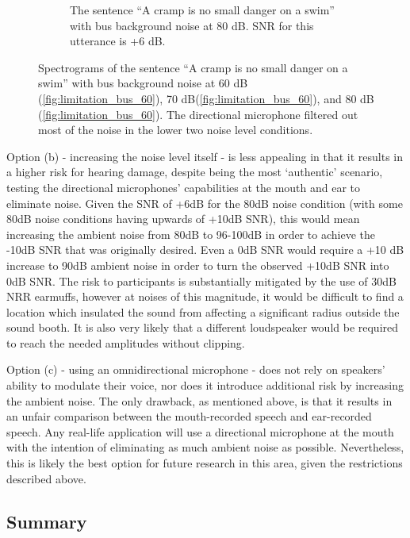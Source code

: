 \documentclass[dissertation,copyright]{uathesis}
\begin{document}
\begin{figure}[h]
\begin{center}
\begin{subfigure}{0.475\textwidth}
  \caption{The sentence ``A cramp is no small danger on a swim'' with bus background noise at 80 dB. SNR for this utterance is +6 dB.}
  \label{fig:limitation_bus_80}
\end{subfigure}
\end{center}
\caption{Spectrograms of the sentence ``A cramp is no small danger on a swim'' with bus background noise at 60 dB (\ref{fig:limitation_bus_60}), 70 dB(\ref{fig:limitation_bus_60}), and 80 dB (\ref{fig:limitation_bus_60}). The directional microphone filtered out most of the noise in the lower two noise level conditions.}
\label{fig:noise_level_limitation}
\end{figure}

Option (b) - increasing the noise level itself - is less appealing in that it results in a higher risk for hearing damage, despite being the most `authentic' scenario, testing the directional microphones' capabilities at the mouth and ear to eliminate noise.  Given the SNR of +6dB for the 80dB noise condition (with some 80dB noise conditions having upwards of +10dB SNR), this would mean increasing the ambient noise from 80dB to 96-100dB in order to achieve the -10dB SNR that was originally desired.  Even a 0dB SNR would require a +10 dB increase to 90dB ambient noise in order to turn the observed +10dB SNR into 0dB SNR. The risk to participants is substantially mitigated by the use of 30dB NRR earmuffs, however at noises of this magnitude, it would be difficult to find a location which insulated the sound from affecting a significant radius outside the sound booth.  It is also very likely that a different loudspeaker would be required to reach the needed amplitudes without clipping.

Option (c) - using an omnidirectional microphone - does not rely on speakers' ability to modulate their voice, nor does it introduce additional risk by increasing the ambient noise.  The only drawback, as mentioned above, is that it results in an unfair comparison between the mouth-recorded speech and ear-recorded speech.  Any real-life application will use a directional microphone at the mouth with the intention of eliminating as much ambient noise as possible.  Nevertheless, this is likely the best option for future research in this area, given the restrictions described above.

\subsection{Summary}
\end{document}
